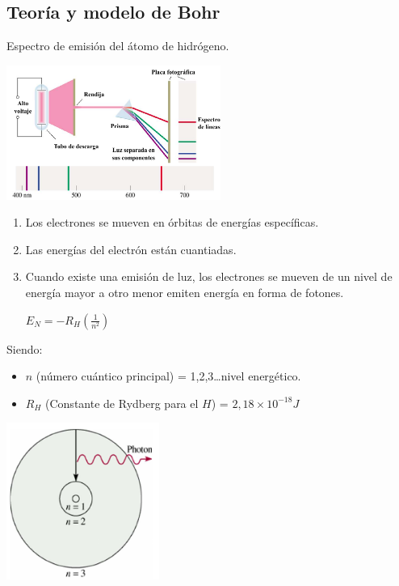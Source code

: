     \subsection{Teoría y modelo de Bohr}
        \indent Espectro de emisión del átomo de hidrógeno.
        \begin{center} \includegraphics[width=7cm]{./imagenes/espectroEmisionHidrogeno.png} \end{center}
        \saltoPag%
        \begin{enumerate}
            \item Los electrones se mueven en órbitas de energías específicas.
            \item Las energías del electrón están cuantiadas.
            \item Cuando existe una emisión de luz, los electrones se mueven de un nivel de energía mayor a otro menor emiten energía en forma de fotones.
            \begin{center} 
                $E_N = - R_H (\frac{1}{n^2})$
            \end{center}
        \end{enumerate}
        \indent Siendo:
        \begin{itemize}
            \item $n$ (número cuántico principal) = 1,2,3\dots nivel energético.
            \item $R_H$ (Constante de Rydberg para el $H$) = $2,18 \times 10^{-18}J$
        \end{itemize}
        \begin{center} \includegraphics[width=5cm]{./imagenes/nivelesDeEnergia.png} \end{center}
